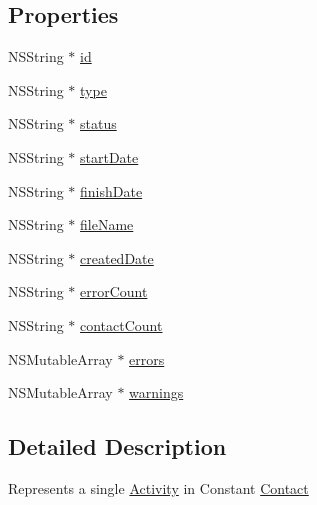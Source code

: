 \subsection*{Properties}
\begin{DoxyCompactItemize}
\item 
N\-S\-String $\ast$ \hyperlink{interface_activity_a84ac9c4a42c6b67f863bea5839146274}{id}
\item 
N\-S\-String $\ast$ \hyperlink{interface_activity_a8619c7b5d0a0a2cfdad6a94c6ea45595}{type}
\item 
N\-S\-String $\ast$ \hyperlink{interface_activity_a578a5685a7c166b438e9c5f9596d7ae4}{status}
\item 
N\-S\-String $\ast$ \hyperlink{interface_activity_ad1b9a79c58a3f4b19e82195cab809fd4}{start\-Date}
\item 
N\-S\-String $\ast$ \hyperlink{interface_activity_a1d860160f4fc5dcc362b364dbf556ffd}{finish\-Date}
\item 
N\-S\-String $\ast$ \hyperlink{interface_activity_ad3402799bc6113ec527f54788dce3777}{file\-Name}
\item 
N\-S\-String $\ast$ \hyperlink{interface_activity_a3b0d23eb3c06d0854f0e7f63701f8749}{created\-Date}
\item 
N\-S\-String $\ast$ \hyperlink{interface_activity_abe1f522a0ec0a7c3e379273838a4da45}{error\-Count}
\item 
N\-S\-String $\ast$ \hyperlink{interface_activity_ab9ad52e8f64b80becf9be642f1d5d786}{contact\-Count}
\item 
N\-S\-Mutable\-Array $\ast$ \hyperlink{interface_activity_af4fc739f25f0e96f0a044a00e596fe5e}{errors}
\item 
N\-S\-Mutable\-Array $\ast$ \hyperlink{interface_activity_a59cf6d1a6bc8d97f373e5b05f852ce31}{warnings}
\end{DoxyCompactItemize}


\subsection{Detailed Description}
Represents a single \hyperlink{interface_activity}{Activity} in Constant \hyperlink{interface_contact}{Contact} 

